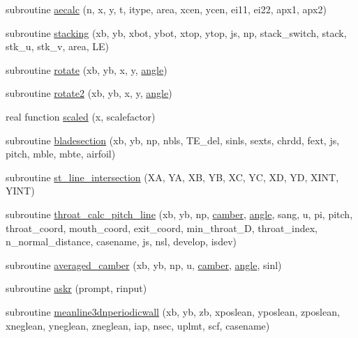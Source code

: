\begin{DoxyCompactItemize}
\item 
subroutine \hyperlink{func_nsubs_8f90_a788e8b317e0de3c84602920daaade52b}{aecalc} (n, x, y, t, itype, area, xcen, ycen, ei11, ei22, apx1, apx2)
\item 
subroutine \hyperlink{func_nsubs_8f90_ac45892d1114b6596d21635c8ff1c9429}{stacking} (xb, yb, xbot, ybot, xtop, ytop, js, np, stack\+\_\+switch, stack, stk\+\_\+u, stk\+\_\+v, area, L\+E)
\item 
subroutine \hyperlink{func_nsubs_8f90_a769176856aeaec2c9518c91f01f5f4fe}{rotate} (xb, yb, x, y, \hyperlink{bsplinecam_8f90_af4379365bf9e92538191fcb377a6e7fa}{angle})
\item 
subroutine \hyperlink{func_nsubs_8f90_a94eb8a9dd035c46326a5720675b5eca7}{rotate2} (xb, yb, x, y, \hyperlink{bsplinecam_8f90_af4379365bf9e92538191fcb377a6e7fa}{angle})
\item 
real function \hyperlink{func_nsubs_8f90_a50bc8afe7f9e452ccb73514e97ca797a}{scaled} (x, scalefactor)
\item 
subroutine \hyperlink{func_nsubs_8f90_a91a04c46162d2923e385fb150c9dd7c7}{bladesection} (xb, yb, np, nbls, T\+E\+\_\+del, sinls, sexts, chrdd, fext, js, pitch, mble, mbte, airfoil)
\item 
subroutine \hyperlink{func_nsubs_8f90_ae926fe9b2bcad043feaf1b7e5f4e7ab6}{st\+\_\+line\+\_\+intersection} (X\+A, Y\+A, X\+B, Y\+B, X\+C, Y\+C, X\+D, Y\+D, X\+I\+N\+T, Y\+I\+N\+T)
\item 
subroutine \hyperlink{func_nsubs_8f90_ad23786e7bb8cf9c0b066f4bc0930a172}{throat\+\_\+calc\+\_\+pitch\+\_\+line} (xb, yb, np, \hyperlink{bsplinecam_8f90_a5f344dd1ac7aa0679039a2bd0531aec6}{camber}, \hyperlink{bsplinecam_8f90_af4379365bf9e92538191fcb377a6e7fa}{angle}, sang, u, pi, pitch, throat\+\_\+coord, mouth\+\_\+coord, exit\+\_\+coord,                                                                                                                                   min\+\_\+throat\+\_\+D, throat\+\_\+index, n\+\_\+normal\+\_\+distance, casename, js, nsl, develop, isdev)
\item 
subroutine \hyperlink{func_nsubs_8f90_ada1a18ee307fefd9aad27217363e594f}{averaged\+\_\+camber} (xb, yb, np, u, \hyperlink{bsplinecam_8f90_a5f344dd1ac7aa0679039a2bd0531aec6}{camber}, \hyperlink{bsplinecam_8f90_af4379365bf9e92538191fcb377a6e7fa}{angle}, sinl)
\item 
subroutine \hyperlink{func_nsubs_8f90_ada44c10e93da7731616a3c34a28951e3}{askr} (prompt, rinput)
\item 
subroutine \hyperlink{func_nsubs_8f90_ac9fbd4cb2aee0e492314a37b00788ff1}{meanline3dnperiodicwall} (xb, yb, zb, xposlean, yposlean, zposlean,                                                                                                                                       xneglean, yneglean, zneglean, iap, nsec,                                                                                                                                       uplmt, scf, casename)

\end{DoxyCompactItemize}
